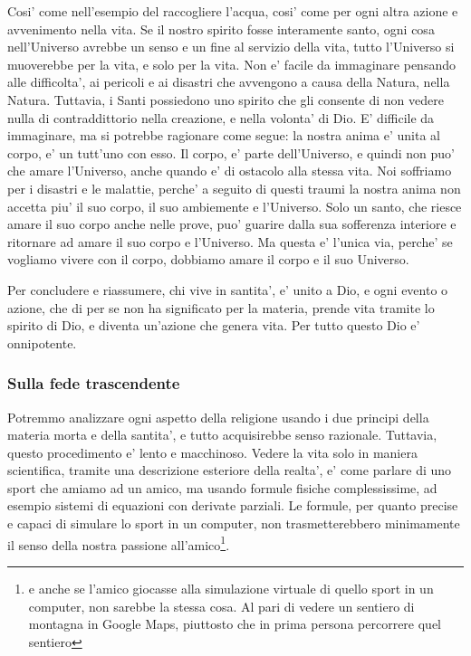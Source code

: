 Cosi' come nell'esempio del raccogliere l'acqua, cosi' come per ogni altra azione e avvenimento nella vita. Se il nostro spirito fosse interamente santo, ogni cosa nell'Universo avrebbe un senso e un fine al servizio della vita, tutto l'Universo si muoverebbe per la vita, e solo per la vita. Non e' facile da immaginare pensando alle difficolta', ai pericoli e ai disastri che avvengono a causa della Natura, nella Natura. Tuttavia, i Santi possiedono uno spirito che gli consente di non vedere nulla di contraddittorio nella creazione, e nella volonta' di Dio. E' difficile da immaginare, ma si potrebbe ragionare come segue: la nostra anima e' unita al corpo, e' un tutt'uno con esso. Il corpo, e' parte dell'Universo, e quindi non puo' che amare l'Universo, anche quando e' di ostacolo alla stessa vita. Noi soffriamo per i disastri e le malattie, perche' a seguito di questi traumi la nostra anima non accetta piu' il suo corpo, il suo ambiemente e l'Universo. Solo un santo, che riesce amare il suo corpo anche nelle prove, puo' guarire dalla sua sofferenza interiore e ritornare ad amare il suo corpo e l'Universo. Ma questa e' l'unica via, perche' se vogliamo vivere con il corpo, dobbiamo amare il corpo e il suo Universo.

Per concludere e riassumere, chi vive in santita', e' unito a Dio, e ogni evento o azione, che di per se non ha significato per la materia, prende vita tramite lo spirito di Dio, e diventa un'azione che genera vita. Per tutto questo Dio e' onnipotente.


\subsubsection{Sulla fede trascendente}
\label{SullaFede}
Potremmo analizzare ogni aspetto della religione usando i due principi della materia morta e della santita', e tutto acquisirebbe senso razionale. Tuttavia, questo procedimento e' lento e macchinoso. 
Vedere la vita solo in maniera scientifica, tramite una descrizione esteriore della realta', e' come parlare di uno sport che amiamo ad un amico, ma usando formule fisiche complessissime, ad esempio sistemi di equazioni con derivate parziali. Le formule, per quanto precise e capaci di simulare lo sport in un computer, non trasmetterebbero minimamente il senso della nostra passione all'amico\footnote{e anche se l'amico giocasse alla simulazione virtuale di quello sport in un computer, non sarebbe la stessa cosa. Al pari di vedere un sentiero di montagna in Google Maps, piuttosto che in prima persona percorrere quel sentiero}.

